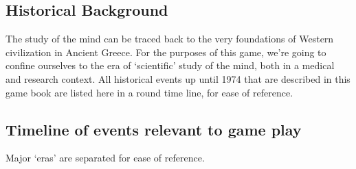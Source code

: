 \begin{refsection}
\pagebreak 

\chapter{Historical Background}
\label{historicalbackground}

The study of the mind can be traced back to the very foundations of Western civilization in Ancient Greece. For the purposes of this game, we're going to confine ourselves to the era of `scientific' study of the mind, both in a medical and research context. All historical events up until 1974 that are described in this game book are listed here in a round time line, for ease of reference.

\section{Timeline of events relevant to game play}
\label{timelineofeventsrelevanttogameplay}

Major `eras' are separated for ease of reference.


\end{refsection}
